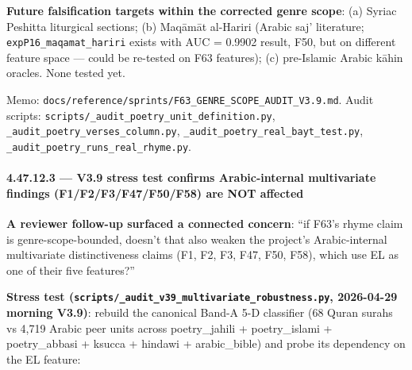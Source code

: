 \documentclass[
]{article}
\begin{document}
\textbf{Future falsification targets within the corrected genre scope}:
(a) Syriac Peshitta liturgical sections; (b) Maqāmāt al-Hariri (Arabic
saj' literature; \texttt{expP16\_maqamat\_hariri} exists with AUC =
0.9902 result, F50, but on different feature space --- could be
re-tested on F63 features); (c) pre-Islamic Arabic kāhin oracles. None
tested yet.

Memo: \texttt{docs/reference/sprints/F63\_GENRE\_SCOPE\_AUDIT\_V3.9.md}.
Audit scripts: \texttt{scripts/\_audit\_poetry\_unit\_definition.py},
\texttt{\_audit\_poetry\_verses\_column.py},
\texttt{\_audit\_poetry\_real\_bayt\_test.py},
\texttt{\_audit\_poetry\_runs\_real\_rhyme.py}.

\paragraph{4.47.12.3 --- V3.9 stress test confirms Arabic-internal
multivariate findings (F1/F2/F3/F47/F50/F58) are NOT
affected}\label{v3.9-stress-test-confirms-arabic-internal-multivariate-findings-f1f2f3f47f50f58-are-not-affected}

\textbf{A reviewer follow-up surfaced a connected concern}: ``if F63's
rhyme claim is genre-scope-bounded, doesn't that also weaken the
project's Arabic-internal multivariate distinctiveness claims (F1, F2,
F3, F47, F50, F58), which use EL as one of their five features?''

\textbf{Stress test
(\texttt{scripts/\_audit\_v39\_multivariate\_robustness.py}, 2026-04-29
morning V3.9)}: rebuild the canonical Band-A 5-D classifier (68 Quran
surahs vs 4,719 Arabic peer units across poetry\_jahili + poetry\_islami
+ poetry\_abbasi + ksucca + hindawi + arabic\_bible) and probe its
dependency on the EL feature:
\end{document}
